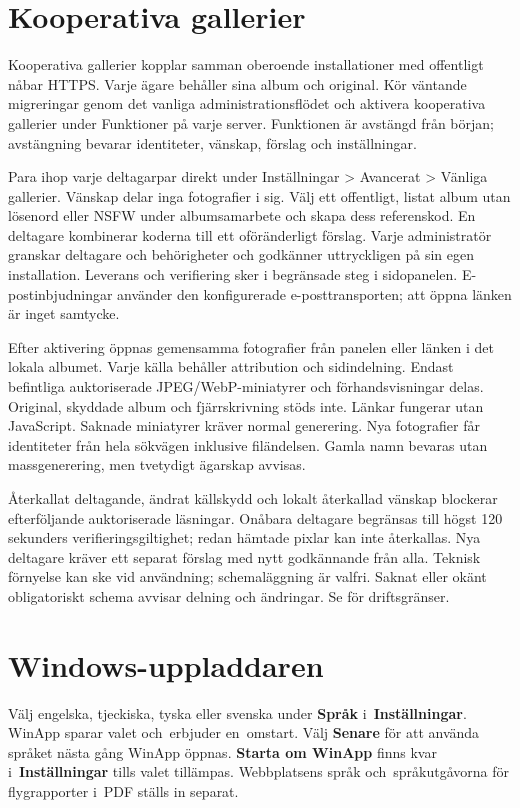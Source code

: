 \documentclass[11pt,a4paper]{article}
\newcommand{\filepath}[1]{\path{#1}}
\newcommand{\ui}[1]{\textbf{#1}}
\begin{document}
\section{Kooperativa gallerier}
Kooperativa gallerier kopplar samman oberoende installationer med offentligt
nåbar HTTPS. Varje ägare behåller sina album och original. Kör väntande
migreringar genom det vanliga administrationsflödet och aktivera kooperativa
gallerier under Funktioner på varje server. Funktionen är avstängd från början;
avstängning bevarar identiteter, vänskap, förslag och inställningar.

Para ihop varje deltagarpar direkt under Inställningar > Avancerat > Vänliga
gallerier. Vänskap delar inga fotografier i sig. Välj ett offentligt, listat
album utan lösenord eller NSFW under albumsamarbete och skapa dess referenskod.
En deltagare kombinerar koderna till ett oföränderligt förslag. Varje
administratör granskar deltagare och behörigheter och godkänner uttryckligen på
sin egen installation. Leverans och verifiering sker i begränsade steg i
sidopanelen. E-postinbjudningar använder den konfigurerade e-posttransporten;
att öppna länken är inget samtycke.

Efter aktivering öppnas gemensamma fotografier från panelen eller länken i det
lokala albumet. Varje källa behåller attribution och sidindelning. Endast
befintliga auktoriserade JPEG/WebP-miniatyrer och förhandsvisningar delas.
Original, skyddade album och fjärrskrivning stöds inte. Länkar fungerar utan
JavaScript. Saknade miniatyrer kräver normal generering. Nya fotografier får
identiteter från hela sökvägen inklusive filändelsen. Gamla namn bevaras utan
massgenerering, men tvetydigt ägarskap avvisas.

Återkallat deltagande, ändrat källskydd och lokalt återkallad vänskap blockerar
efterföljande auktoriserade läsningar. Onåbara deltagare begränsas till högst
120 sekunders verifieringsgiltighet; redan hämtade pixlar kan inte återkallas.
Nya deltagare kräver ett separat förslag med nytt godkännande från alla. Teknisk
förnyelse kan ske vid användning; schemaläggning är valfri. Saknat eller okänt
obligatoriskt schema avvisar delning och ändringar. Se
\filepath{docs/COOPERATIVE_GALLERIES.md} för driftsgränser.

\section{Windows-uppladdaren}
Välj engelska, tjeckiska, tyska eller svenska under \ui{Språk} i~\ui{Inställningar}.
WinApp sparar valet och~erbjuder en~omstart. Välj \ui{Senare} för att använda
språket nästa gång WinApp öppnas.
\ui{Starta om WinApp} finns kvar i~\ui{Inställningar} tills valet tillämpas.
Webbplatsens språk och~språkutgåvorna för flygrapporter i~PDF ställs in separat.
\end{document}
